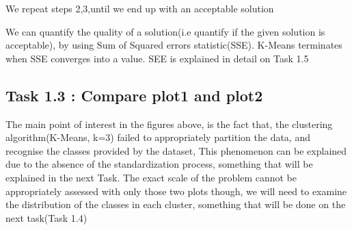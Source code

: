\documentclass[11pt]{article}
\begin{document}

				We repeat steps 2,3,until we end up with an acceptable solution

				We can quantify the quality of a solution(i.e quantify if the given solution is acceptable), by using Sum of Squared errors statistic(SSE). K-Means terminates when SSE converges into a value. SEE is explained in detail on Task 1.5
				
		 \subsection*{Task 1.3 : Compare plot1 and plot2}
			The main point of interest in the figures above, is the fact that, the clustering algorithm(K-Means, k=3) failed to appropriately partition the data, and recognise the classes provided by the dataset, This phenomenon can be explained due to the absence of the standardization process, something that will be explained in the next Task. The exact scale of the problem cannot be appropriately assessed with only those two plots though, we will need to examine the distribution of the classes in each cluster, something that will be done on the next task(Task 1.4)
		
\end{document}
